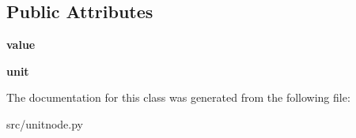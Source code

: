 \subsection*{Public Attributes}
\begin{DoxyCompactItemize}
\item 
\mbox{\label{classsrc_1_1unitnode_1_1UnitNode_ad1eb2c14aa2cd340dbb9f043aca9340f}} 
{\bfseries value}
\item 
\mbox{\label{classsrc_1_1unitnode_1_1UnitNode_a4c451db0a255fb0bcb25c04222682a9b}} 
{\bfseries unit}
\end{DoxyCompactItemize}


The documentation for this class was generated from the following file\+:\begin{DoxyCompactItemize}
\item 
src/unitnode.\+py\end{DoxyCompactItemize}
